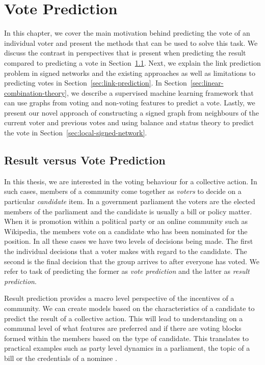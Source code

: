\chapter{Vote Prediction}
\label{chp:vote-prediction}
In this chapter, we cover the main motivation behind predicting the vote of an individual voter and present the methods that can be used to solve this task. We discuss the contrast in perspectives that is present when predicting the result compared to predicting a vote in Section~\ref{sec:result-vs-vote}. Next, we explain the link prediction problem in signed networks and the existing approaches as well as limitations to predicting votes in Section~\ref{sec:link-prediction}. In Section~\ref{sec:linear-combination-theory}, we describe a supervised machine learning framework that can use graphs from voting and non-voting features to predict a vote. Lastly, we present our novel approach of constructing a signed graph from neighbours of the current voter and previous votes and using balance and status theory to predict the vote in Section~\ref{sec:local-signed-network}. 


\section{Result versus Vote Prediction}
\label{sec:result-vs-vote}
In this thesis, we are interested in the voting behaviour for a collective action. In such cases, members of a community come together as \textit{voters} to decide on a particular \textit{candidate} item. In a government parliament  the voters are the elected members of the parliament and the candidate is usually a bill or policy matter. When it is promotion within a political party or an online community such as Wikipedia, the members vote on a candidate who has been nominated for the position. In all these cases we have two levels of decisions being made. The first the individual decisions that a voter makes with regard to the candidate. The second is the final decision that the group arrives to after everyone has voted. We refer to task of predicting the former as \textit{vote prediction} and the latter as \textit{result prediction}. 

Result prediction provides a macro level perspective of the incentives of a community. We can create models based on the characteristics of a candidate to predict the result of a collective action. This will lead to understanding on a communal level of what features are preferred and if there are voting blocks formed within the members based on the type of candidate. This translates to practical examples such as party level dynamics in a parliament, the topic of a bill or the credentials of a nominee \cite{burke2008mopping,yano2012textual,yogatama-etal-2011-predicting}. 

